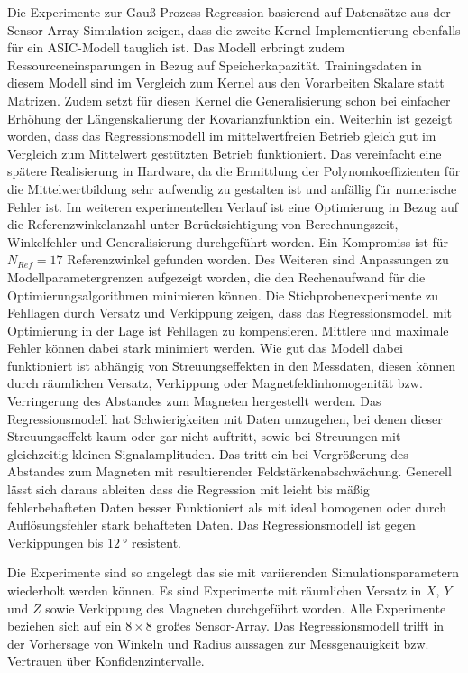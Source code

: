 \newline
Die Experimente zur Gauß-Prozess-Regression basierend auf Datensätze aus der Sensor-Array-Simulation zeigen, dass die zweite Kernel-Implementierung ebenfalls für ein ASIC-Modell tauglich ist. Das Modell erbringt zudem Ressourceneinsparungen in Bezug auf Speicherkapazität. Trainingsdaten in diesem Modell sind im Vergleich zum Kernel aus den Vorarbeiten Skalare statt Matrizen. Zudem setzt für diesen Kernel die Generalisierung schon bei einfacher Erhöhung der Längenskalierung der Kovarianzfunktion ein. Weiterhin ist gezeigt worden, dass das Regressionsmodell im mittelwertfreien Betrieb gleich gut im Vergleich zum Mittelwert gestützten Betrieb funktioniert. Das vereinfacht eine spätere Realisierung in Hardware, da die Ermittlung der Polynomkoeffizienten für die Mittelwertbildung sehr aufwendig zu gestalten ist und anfällig für numerische Fehler ist. Im weiteren experimentellen Verlauf ist eine Optimierung in Bezug auf die Referenzwinkelanzahl unter Berücksichtigung von Berechnungszeit, Winkelfehler und Generalisierung durchgeführt worden. Ein Kompromiss ist für $N_{Ref} = 17$ Referenzwinkel gefunden worden. Des Weiteren sind Anpassungen zu Modellparametergrenzen aufgezeigt worden, die den Rechenaufwand für die Optimierungsalgorithmen minimieren können. Die Stichprobenexperimente zu Fehllagen durch Versatz und Verkippung zeigen, dass das Regressionsmodell mit Optimierung in der Lage ist Fehllagen zu kompensieren. Mittlere und maximale Fehler können dabei stark minimiert werden. Wie gut das  Modell dabei funktioniert ist abhängig von Streuungseffekten in den Messdaten, diesen können durch räumlichen Versatz, Verkippung oder Magnetfeldinhomogenität bzw. Verringerung des Abstandes zum Magneten hergestellt werden. Das Regressionsmodell hat Schwierigkeiten mit Daten umzugehen, bei denen dieser Streuungseffekt kaum oder gar nicht auftritt, sowie bei Streuungen mit gleichzeitig kleinen Signalamplituden. Das tritt ein bei Vergrößerung des Abstandes zum Magneten mit resultierender Feldstärkenabschwächung. Generell lässt sich daraus ableiten dass die Regression mit leicht bis mäßig fehlerbehafteten Daten besser Funktioniert als mit ideal homogenen oder durch Auflösungsfehler stark behafteten Daten. Das Regressionsmodell ist gegen Verkippungen bis $\SI{12}{\degree}$ resistent.


\clearpage


Die Experimente sind so angelegt das sie mit variierenden Simulationsparametern wiederholt werden können. Es sind Experimente mit räumlichen Versatz in $X$, $Y$ und $Z$ sowie Verkippung des Magneten durchgeführt worden. Alle Experimente beziehen sich auf ein $8 \times 8$ großes Sensor-Array. Das Regressionsmodell trifft in der Vorhersage von Winkeln und Radius aussagen zur Messgenauigkeit bzw. Vertrauen über Konfidenzintervalle.


